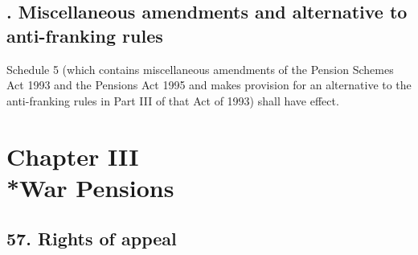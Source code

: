 \documentclass[12pt,a4paper]{article}
\begin{document}
%
%
%
%
%
%


\subsection[56. Miscellaneous amendments and alternative to anti-franking rules]{. Miscellaneous amendments and alternative to anti-franking rules}

Schedule 5 (which contains miscellaneous amendments of the Pension Schemes Act 1993 and the Pensions Act 1995 and makes provision for an alternative to the anti-franking rules in Part III of that Act of 1993) shall have effect.

\section[Chapter III --- War Pensions]{Chapter III\\*War Pensions}

\renewcommand\parthead{--- Part II Chapter III}

\subsection{57. Rights of appeal}
\end{document}
